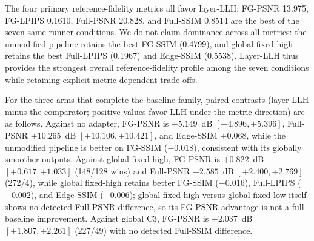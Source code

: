 \documentclass[times,twocolumn,final]{elsarticle}
\begin{document}
\begin{table}[t]
\centering
\caption{Strict-276 Core-7 same-runner matrix under the capped implementation (means over 276 objects). Rows GFL/LFM/LHL(replica)/LLH are the pre-registered confirmation candidates; No adapter, GFH, and GC3 complete the baseline family under the same frozen protocol. Best value per column in bold. Absolute values are not pooled with the legacy uncapped panels (Supplementary S2--S3).}
\label{tab:core7}
\scriptsize
{}
\end{table}

The four primary reference-fidelity metrics all favor layer-LLH: FG-PSNR 13.975, FG-LPIPS 0.1610, Full-PSNR 20.828, and Full-SSIM 0.8514 are the best of the seven same-runner conditions. We do not claim dominance across all metrics: the unmodified pipeline retains the best FG-SSIM (0.4799), and global fixed-high retains the best Full-LPIPS (0.1967) and Edge-SSIM (0.5538). Layer-LLH thus provides the strongest overall reference-fidelity profile among the seven conditions while retaining explicit metric-dependent trade-offs.

For the three arms that complete the baseline family, paired contrasts (layer-LLH minus the comparator; positive values favor LLH under the metric direction) are as follows. Against no adapter, FG-PSNR is $+5.149$~dB $[+4.896,+5.396]$, Full-PSNR $+10.265$~dB $[+10.106,+10.421]$, and Edge-SSIM $+0.068$, while the unmodified pipeline is better on FG-SSIM ($-0.018$), consistent with its globally smoother outputs. Against global fixed-high, FG-PSNR is $+0.822$~dB $[+0.617,+1.033]$ (148/128 wins) and Full-PSNR $+2.585$~dB $[+2.400,+2.769]$ (272/4), while global fixed-high retains better FG-SSIM ($-0.016$), Full-LPIPS ($-0.002$), and Edge-SSIM ($-0.006$); global fixed-high versus global fixed-low itself shows no detected Full-PSNR difference, so its FG-PSNR advantage is not a full-baseline improvement. Against global C3, FG-PSNR is $+2.037$~dB $[+1.807,+2.261]$ (227/49) with no detected Full-SSIM difference.
\end{document}
